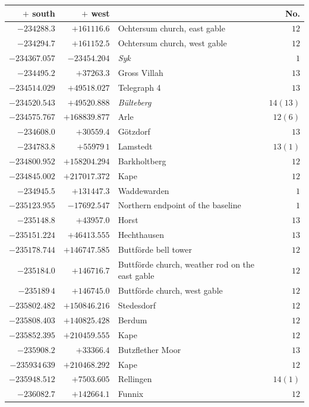 \begin{center}\begingroup\fontsize{8}{9}\selectfont
\setlength{\tabcolsep}{4pt}
\begin{tabular}{r|r|p{170pt}|r}\hline
\(+\) south&\(+\) west&&No.\\\hline
\(-234288.3\)&\(+161116.6\)&Ochtersum church, east gable&\(12\)\\
\(-234294.7\)&\(+161152.5\)&Ochtersum church, west gable&\(12\)\\
\(-234367.057\)&\(-23454.204\)&\textit{Syk}&\(1\)\\
\(-234495.2\)&\(+37263.3\)&Gross Villah&\(13\)\\
\(-234514.029\)&\(+49518.027\)&Telegraph 4&\(13\)\\
\(-234520.543\)&\(+49520.888\)&\textit{Bülteberg}&\(14(13)\)\\
\(-234575.767\)&\(+168839.877\)&Arle&\(12(6)\)\\
\(-234608.0\)&\(+30559.4\)&Götzdorf&\(13\)\\
\(-234783.8\)&\(+55979\,1\)&Lamstedt&\(13(1)\)\\
\(-234800.952\)&\(+158204.294\)&Barkholtberg&\(12\)\\
\(-234845.002\)&\(+217017.372\)&Kape&\(12\)\\
\(-234945.5\)&\(+131447.3\)&Waddewarden&\(1\)\\
\(-235123.955\)&\(-17692.547\)&Northern endpoint of the baseline&\(1\)\\
\(-235148.8\)&\(+43957.0\)&Horst&\(13\)\\
\(-235151.224\)&\(+46413.555\)&Hechthausen&\(13\)\\
\(-235178.744\)&\(+146747.585\)&Buttförde bell tower&\(12\)\\
\(-235184.0\)&\(+146716.7\)&Buttförde church, weather rod on the east gable&\(12\)\\
\(-235189\,4\)&\(+146745.0\)&Buttförde church, west gable&\(12\)\\
\(-235802.482\)&\(+150846.216\)&Stedesdorf&\(12\)\\
\(-235808.403\)&\(+140825.428\)&Berdum&\(12\)\\
\(-235852.395\)&\(+210459.555\)&Kape&\(12\)\\
\(-235908.2\)&\(+33366.4\)&Butzflether Moor&\(13\)\\
\(-235934\,639\)&\(+210468.292\)&Kape&\(12\)\\
\(-235948.512\)&\(+7503.605\)&Rellingen&\(14(1)\)\\
\(-236082.7\)&\(+142664.1\)&Funnix&\(12\)\\

\end{tabular}
\end{center}
